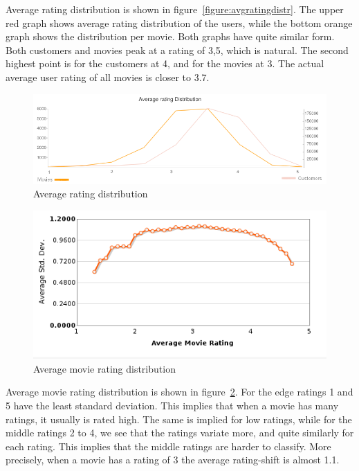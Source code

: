 Average rating distribution is shown in figure~\ref{figure:avgratingdistr}. The upper red graph shows average rating distribution of the users, while the bottom orange graph shows the distribution per movie. Both graphs have quite similar form. Both customers and movies peak at a rating of 3,5, which is natural. The second highest point is for the customers at 4, and for the movies at 3. The actual average user rating of all movies is closer to 3.7.

\begin{figure}[H]
\includegraphics[width=5in]{image/avgratdistrover.png}
\centering
\caption{Average rating distribution}
\label{figure:avgratdistrover}
\end{figure}


\begin{figure}[H]
\includegraphics[width=5in]{image/avgmovierating.png}
\centering
\caption{Average movie rating distribution~\cite{td-nf-r}}
\label{figure:avgmovierating}
\end{figure}

Average movie rating distribution is shown in figure~\ref{figure:avgmovierating}. For the edge ratings 1 and 5 have the least standard deviation. This implies that when a movie has many ratings, it usually is rated high. The same is implied for low ratings, while for the middle ratings 2 to 4, we see that the ratings variate more, and quite similarly for each rating. This implies that the middle ratings are harder to classify. More precisely, when a movie has a rating of 3 the average rating-shift is almost 1.1.


